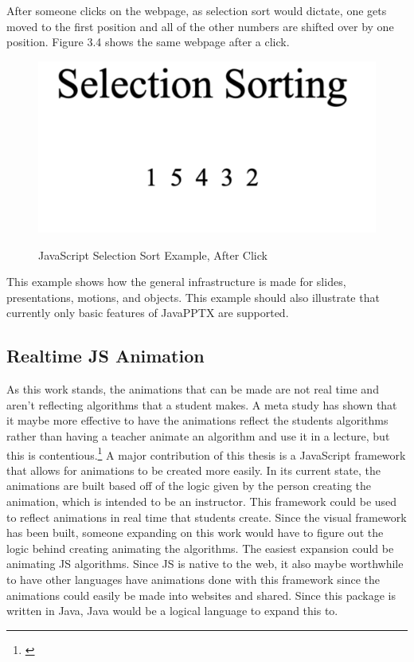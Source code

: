 \documentclass[12pt,twoside]{reedthesis}
\begin{document}
After someone clicks on the webpage, as selection sort would dictate, one gets moved to the first position and all of the other numbers are shifted over by one position. Figure 3.4 shows the same webpage after a click. 
\begin{figure}[htbp] 
\begin{centering} 
\caption{JavaScript Selection Sort Example, After Click} 
\includegraphics[scale=0.7]{selsortafter} 
\label{subd}
\end{centering} 
\end{figure}
This example shows how the general infrastructure is made for slides, presentations, motions, and objects. This example should also illustrate that currently only basic features of JavaPPTX are supported. 


\subsection{Realtime JS Animation}
As this work stands, the animations that can be made are not real time and aren't reflecting algorithms that a student makes. A meta study has shown that it maybe more effective to have the animations reflect the students algorithms rather than having a teacher animate an algorithm and use it in a lecture, but this is contentious.\footnote{\cite{hundhausen_meta-study_2002}} A major contribution of this thesis is a JavaScript framework that allows for animations to be created more easily. In its current state, the animations are built based off of the logic given by the person creating the animation, which is intended to be an instructor. This framework could be used to reflect animations in real time that students create. Since the visual framework has been built, someone expanding on this work would have to figure out the logic behind creating animating the algorithms. The easiest expansion could be animating JS algorithms. Since JS is native to the web, it also maybe worthwhile to have other languages have animations done with this framework since the animations could easily be made into websites and shared. Since this package is written in Java, Java would be a logical language to expand this to. 
\end{document}
